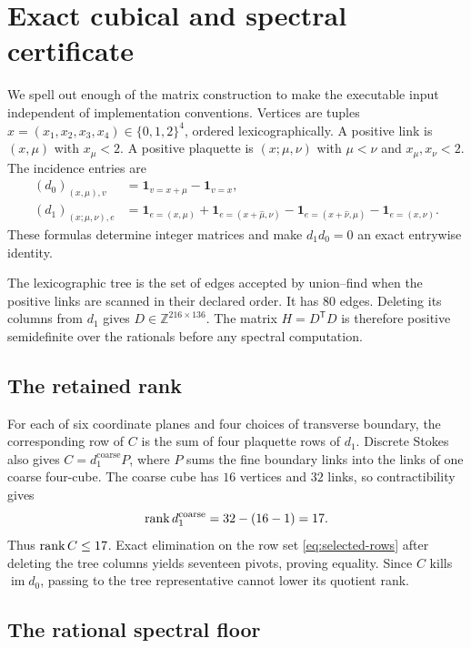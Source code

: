 \section{Exact cubical and spectral certificate}\label{app:linear-algebra}

We spell out enough of the matrix construction to make the executable input
independent of implementation conventions.  Vertices are tuples
$x=(x_1,x_2,x_3,x_4)\in\{0,1,2\}^4$, ordered lexicographically.  A positive
link is $(x,\mu)$ with $x_\mu<2$.  A positive plaquette is
$(x;\mu,\nu)$ with $\mu<\nu$ and $x_\mu,x_\nu<2$.  The incidence entries are
\begin{align*}
 (d_0)_{(x,\mu),v}
 &=\mathbf1_{v=x+\hat\mu}-\mathbf1_{v=x},\\
 (d_1)_{(x;\mu,\nu),e}
 &=\mathbf1_{e=(x,\mu)}+\mathbf1_{e=(x+\hat\mu,\nu)}
  -\mathbf1_{e=(x+\hat\nu,\mu)}-\mathbf1_{e=(x,\nu)}.
\end{align*}
These formulas determine integer matrices and make $d_1d_0=0$ an exact
entrywise identity.

The lexicographic tree is the set of edges accepted by union--find when the
positive links are scanned in their declared order.  It has $80$ edges.
Deleting its columns from $d_1$ gives $D\in\mathbb Z^{216\times136}$.  The
matrix $H=D^{\mathsf T}D$ is therefore positive semidefinite over the rationals
before any spectral computation.

\subsection{The retained rank}

For each of six coordinate planes and four choices of transverse boundary,
the corresponding row of $C$ is the sum of four plaquette rows of $d_1$.
Discrete Stokes also gives $C=d_1^{\mathrm{coarse}}P$, where $P$ sums the
fine boundary links into the links of one coarse four-cube.  The coarse cube
has $16$ vertices and $32$ links, so contractibility gives
\[
 \operatorname{rank} d_1^{\mathrm{coarse}}=32-(16-1)=17.
\]
Thus $\operatorname{rank} C\le17$.  Exact elimination on the row set
\eqref{eq:selected-rows} after deleting the tree columns yields seventeen
pivots, proving equality.  Since $C$ kills $\operatorname{im}d_0$, passing to
the tree representative cannot lower its quotient rank.

\subsection{The rational spectral floor}

